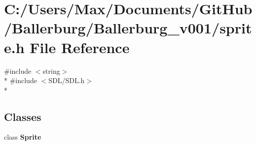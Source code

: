 \section{C\+:/\+Users/\+Max/\+Documents/\+Git\+Hub/\+Ballerburg/\+Ballerburg\+\_\+v001/sprite.h File Reference}
\label{sprite_8h}
{\ttfamily \#include $<$string$>$}\\*
{\ttfamily \#include $<$S\+D\+L/\+S\+D\+L.\+h$>$}\\*
\subsection*{Classes}
\begin{DoxyCompactItemize}
\item 
class {\bf Sprite}
\end{DoxyCompactItemize}
